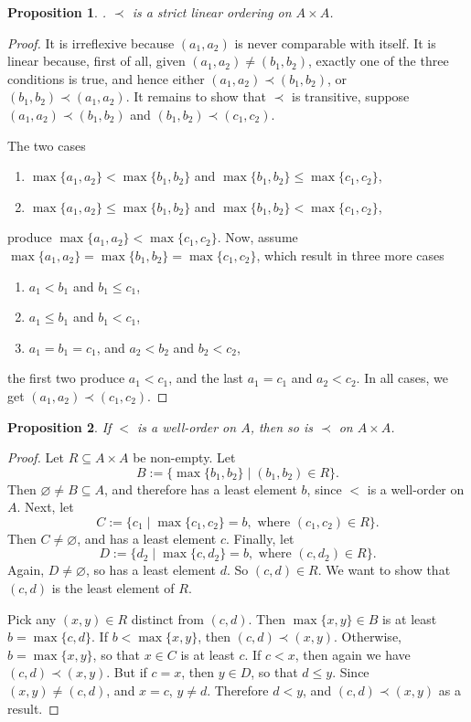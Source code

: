 \documentclass[12pt]{article}
\newtheorem{prop}{Proposition}
\begin{document}
\begin{prop}.  $\prec$ is a strict linear ordering on $A\times A$.  \end{prop}
\begin{proof}  It is irreflexive because $(a_1,a_2)$ is never comparable with itself.  It is linear because, first of all, given $(a_1,a_2)\ne (b_1,b_2)$, exactly one of the three conditions is true, and hence either $(a_1,a_2)\prec (b_1,b_2)$, or $(b_1,b_2)\prec (a_1,a_2)$.  It remains to show that $\prec$ is transitive, suppose $(a_1,a_2)\prec (b_1,b_2)$ and $(b_1,b_2)\prec (c_1,c_2)$.

The two cases 
\begin{enumerate}
\item $\max \lbrace a_1,a_2\rbrace < \max \lbrace b_1, b_2\rbrace$ and $\max \lbrace b_1,b_2\rbrace \le \max \lbrace c_1, c_2\rbrace$, 
\item $\max \lbrace a_1,a_2\rbrace \le \max \lbrace b_1, b_2\rbrace$ and $\max \lbrace b_1,b_2\rbrace < \max \lbrace c_1, c_2\rbrace$,
\end{enumerate}
produce $\max \lbrace a_1,a_2\rbrace < \max \lbrace c_1, c_2\rbrace$.  Now, assume $\max \lbrace a_1,a_2\rbrace = \max \lbrace b_1, b_2\rbrace = \max \lbrace c_1, c_2\rbrace$, which result in three more cases
\begin{enumerate}
\item $a_1 < b_1$ and $b_1 \le c_1$, 
\item $a_1 \le b_1$ and $b_1 < c_1$,
\item $a_1=b_1=c_1$, and $a_2 < b_2$ and $b_2 < c_2$,
\end{enumerate}
the first two produce $a_1 < c_1$, and the last $a_1=c_1$ and $a_2<c_2$.  In all cases, we get $(a_1,a_2)\prec (c_1,c_2)$.
\end{proof}

\begin{prop}  If $<$ is a well-order on $A$, then so is $\prec$ on $A\times A$. \end{prop}
\begin{proof} 
Let $R\subseteq A\times A$ be non-empty.  Let $$B:=\lbrace \max \lbrace b_1,b_2\rbrace \mid (b_1,b_2)\in R\rbrace.$$  Then $\varnothing \ne B \subseteq A$, and therefore has a least element $b$, since $<$ is a well-order on $A$.  Next, let $$C:=\lbrace c_1 \mid \max\lbrace c_1, c_2 \rbrace = b, \mbox{ where }(c_1,c_2)\in R \rbrace.$$  Then $C\ne \varnothing$, and has a least element $c$.  Finally, let $$D:=\lbrace d_2 \mid \max \lbrace c,d_2\rbrace = b, \mbox{ where }(c,d_2)\in R\rbrace.$$  Again, $D\ne \varnothing$, so has a least element $d$.  So $(c,d)\in R$.  We want to show that $(c,d)$ is the least element of $R$. 

Pick any $(x,y)\in R$ distinct from $(c,d)$.  Then $\max \lbrace x, y\rbrace \in B$ is at least $b = \max\lbrace c,d\rbrace$.  If $b<\max \lbrace x, y\rbrace$, then $(c,d) \prec (x,y)$.  Otherwise, $b=\max \lbrace x, y\rbrace$, so that $x\in C$ is at least $c$.  If $c < x$, then again we have $(c,d) \prec (x,y)$.  But if $c=x$, then $y\in D$, so that $d \le y$.  Since $(x,y)\ne (c,d)$, and $x=c$, $y\ne d$.  Therefore $d < y$, and $(c,d)\prec (x,y)$ as a result.
\end{proof}
\end{document}
